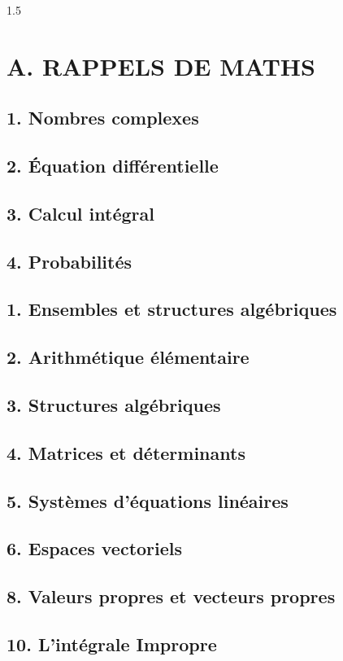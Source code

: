 \documentclass[12pt]{article}
\begin{document}
\begin{spacing}{1.5}
\newpage

\section*{\textbf{A. RAPPELS DE MATHS}}

\subsection*{1.  Nombres complexes}
\subsection*{2. Équation différentielle}
\subsection*{3. Calcul intégral}
\subsection*{4. Probabilités}
\subsection*{1. Ensembles et structures algébriques}
\subsection*{2. Arithmétique élémentaire}
\subsection*{3. Structures algébriques}
\subsection*{4. Matrices et déterminants}
\subsection*{5. Systèmes d'équations linéaires}
\subsection*{6. Espaces vectoriels}
\subsection*{8. Valeurs propres et vecteurs propres}
\subsection*{10. L'intégrale Impropre}

\end{spacing}
\end{document}
